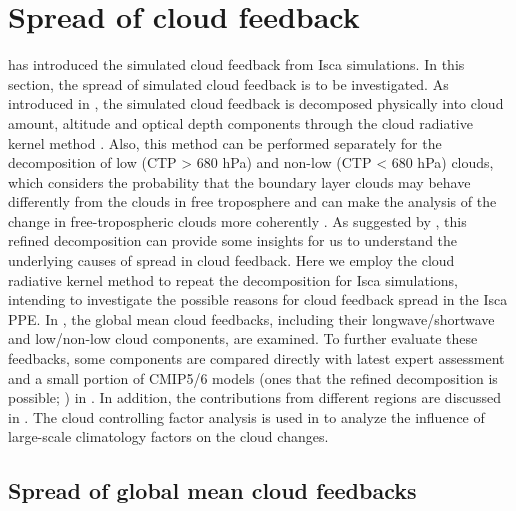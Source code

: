 
\section{Spread of cloud feedback}
\label{sec:spread_of_cld_fbk_in_PPE}

 has introduced the simulated cloud feedback from Isca simulations. In this section, the spread of simulated cloud feedback is to be investigated. As introduced in , the simulated cloud feedback is decomposed physically into cloud amount, altitude and optical depth components through the cloud radiative kernel method \citep{Zelinka2012computing1,Zelinka2012computing2}. Also, this method can be performed separately for the decomposition of low (CTP > 680 hPa) and non-low (CTP < 680 hPa) clouds, which considers the probability that the boundary layer clouds may behave differently from the clouds in free troposphere and can make the analysis of the change in free-tropospheric clouds more coherently \citep{Zelinka2016insights}. As suggested by \cite{Zelinka2016insights}, this refined decomposition can provide some insights for us to understand the underlying causes of spread in cloud feedback. Here we employ the cloud radiative kernel method to repeat the decomposition for Isca simulations, intending to investigate the possible reasons for cloud feedback spread in the Isca PPE. In , the global mean cloud feedbacks, including their longwave/shortwave and low/non-low cloud components, are examined. To further evaluate these feedbacks, some components are compared directly with latest expert assessment \citep{Sherwood2020} and a small portion of CMIP5/6 models (ones that the refined decomposition is possible; \citealt{Zelinka2012climate}) in . In addition, the contributions from different regions are discussed in . The cloud controlling factor analysis is used in  to analyze the influence of large-scale climatology factors on the cloud changes.

\subsection{Spread of global mean cloud feedbacks}
\label{sec:spread_of_gm_cld_fbks_PPE}

